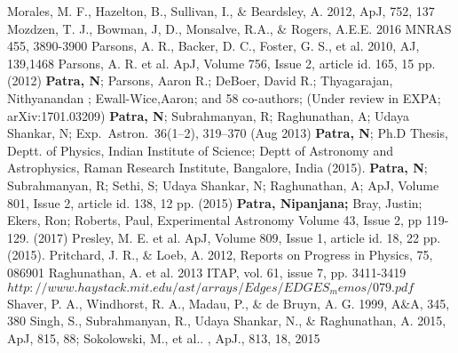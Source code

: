 \documentclass[12pt]{amsart}
\begin{document}
\begin{thebibliography}{}
Morales, M. F., Hazelton, B., Sullivan, I., \& Beardsley, A. 2012,
ApJ, 752, 137
Mozdzen, T. J., Bowman, J, D., Monsalve, R.A., \& Rogers, A.E.E. 2016
MNRAS 455, 3890-3900
Parsons, A. R., Backer, D. C., Foster, G. S., et al. 2010, AJ, 139,1468
Parsons, A. R. et al. ApJ, Volume 756, Issue 2, article id. 165, 15 pp. (2012)
\textbf{\color{blue} Patra, N}; Parsons, Aaron R.;  DeBoer, David R.; Thyagarajan, Nithyanandan ; Ewall-Wice,Aaron; and 58 co-authors; (Under review in EXPA;  arXiv:1701.03209)
\textbf{\color{blue}Patra, N}; Subrahmanyan, R; Raghunathan, A; Udaya Shankar, N; Exp.\ Astron.\ 36(1--2), 319--370 (Aug 2013)
\textbf{\color{blue}Patra, N}; Ph.D Thesis, Deptt. of Physics, Indian Institute of Science; Deptt of Astronomy and Astrophysics, Raman Research Institute, Bangalore, India (2015).
\textbf{\color{blue}Patra, N}; Subrahmanyan, R; Sethi, S; Udaya Shankar, N; Raghunathan, A; ApJ, Volume 801, Issue 2, article id. 138, 12 pp. (2015)
{\bf \color{blue}Patra, Nipanjana;}  Bray, Justin; Ekers, Ron; Roberts, Paul, Experimental Astronomy   Volume 43, Issue 2, pp 119-129. (2017)
Presley, M. E. et al. ApJ, Volume 809, Issue 1, article id. 18, 22 pp. (2015).
Pritchard, J. R., \& Loeb, A. 2012, Reports on Progress in
Physics, 75, 086901
Raghunathan, A. et al. 2013
ITAP, vol. 61, issue 7, pp. 3411-3419
$http://www.haystack.mit.edu/ast/arrays/Edges/EDGES_memos/079.pdf$
Shaver, P. A., Windhorst, R. A., Madau, P., \& de Bruyn, A. G.
1999, A\&A, 345, 380
Singh, S., Subrahmanyan, R., Udaya Shankar, N., \& Raghunathan, A. 2015,  ApJ, 815, 88;
Sokolowski, M., et al.. ,  ApJ., 813, 18, 2015

\end{thebibliography}
\end{document}
